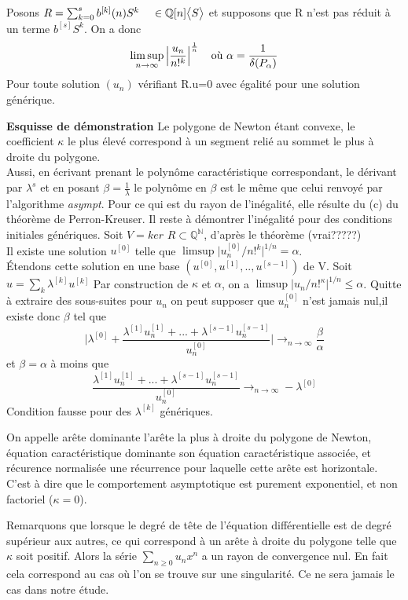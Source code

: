 \documentclass[a4paper,10.5pt]{article}
\begin{document}
	\begin{proposition} Posons $R=\sum_{k=0}^{s} b^{[k]}(n)S^{k} \hspace{4mm} \in \mathbb{Q}[n]\big<S\big>$ et supposons que R n'est pas réduit à un terme $b^{[s]}S^{k}$. On a donc
		\[\limsup_{n \rightarrow \infty }\Big|\frac{u_{n}}{n!^{k}}\Big|^{\frac{1}{n}} \hspace{4mm} \text{où } \alpha=\frac{1}{\delta(P_{\alpha})}\]
		Pour toute solution $(u_{n})$ vérifiant R.u=0 avec égalité pour une solution générique. 
	\end{proposition}
	\textbf{Esquisse de démonstration}
	Le polygone de Newton étant convexe, le coefficient $\kappa$ le plus élevé correspond à un segment relié au sommet le plus à droite du polygone.\\
	Aussi, en écrivant prenant le polynôme caractéristique correspondant, le dérivant par $\lambda^{s}$ et en posant $\beta=\frac{1}{\lambda}$ le polynôme en $\beta$ est le même que celui renvoyé par l'algorithme \textit{asympt}. Pour ce qui est du rayon de l'inégalité, elle résulte du (c) du théorème de Perron-Kreuser.
	Il reste à démontrer l'inégalité pour des conditions initiales génériques. Soit $V=ker$ $R \subset \mathbb{Q}^{\mathbb{N}}$, d'après le théorème (vrai?????)\\
	Il existe une solution $u^{[0]}$ telle que $\limsup \big|u^{[0]}_{n}/n!^{k}\big|^{1/n}=\alpha$.\\
	Étendons cette solution en une base $(u^{[0]},u^{[1]},..,u^{[s-1]})$ de V. Soit $u=\sum_{k}\lambda^{[k]}u^{[k]}$
	Par construction de $\kappa$ et $\alpha$, on a $\limsup \big|u_{n}/n!^{\kappa}\big|^{1/n} \leq \alpha$. Quitte à extraire des sous-suites pour $u_{n}$ on peut supposer que $u^{[0]}_{n}$ n'est jamais nul,il existe donc $\beta$ tel que
	\[\Big|\lambda^{[0]}+\frac{\lambda^{[1]}u^{[1]}_{n}+...+\lambda^{[s-1]}u^{[s-1]}_{n}}{u^{[0]}_{n}}\Big| \rightarrow_{n \rightarrow \infty} \frac{\beta}{\alpha}\] 
	et $\beta=\alpha$ à moins que 
	\[\frac{\lambda^{[1]}u^{[1]}_{n}+...+\lambda^{[s-1]}u^{[s-1]}_{n}}{u^{[0]}_{n}}\rightarrow_{n \rightarrow \infty}-\lambda^{[0]}\]
	Condition fausse pour des $\lambda^{[k]}$ génériques.
	
	\begin{definition} On appelle arête dominante l'arête la plus à droite du polygone de Newton, équation caractéristique dominante son équation caractéristique associée, et récurence normalisée une récurrence pour laquelle cette arête est horizontale. C'est à dire que le comportement asymptotique est purement exponentiel, et non factoriel ($\kappa=0$).
	\end{definition}
	\vspace{7mm}
	Remarquons que lorsque le degré de tête de l'équation différentielle est de degré supérieur aux autres, ce qui correspond à un arête à droite du polygone telle que $\kappa$ soit positif. Alors la série $\sum_{n\geq 0}u_nx^n$ a un rayon de convergence nul. En fait cela correspond au cas où l'on se trouve sur une singularité. Ce ne sera jamais le cas dans notre étude.
	
\end{document}
